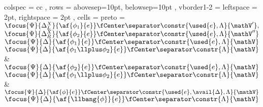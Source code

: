\begin{tblr}{ colspec = { cc } 
	    , rows = {abovesep=10pt, belowsep=10pt}
	    , vborder{1-2} = { leftspace = 2pt, rightspace = 2pt } 
	    , cells = { preto = {\footnotesize} }
	    }
	\AX$\focus{\Psi}{\Delta_L^X}{\af{\phi_1}{e}} \fCenter \separator \constr{\used{e}, \Lambda}{\mathV'},$
	\noLine
	\UI$\focus{\Psi}{\Delta_R^X}{\af{\phi_2}{e}} \fCenter \separator \constr{\used{e}, \Lambda}{\mathV''}$
	\LeftLabel{\derRule{\displayten}}
	\DP
	\\ 
	\AX$\focus{\Psi}{\Delta}{\af{\phi_1}{e}} \fCenter \separator \constr{\used{e}, \Lambda}{\mathV}$
	\LeftLabel{\derRule{\displayplus[L]}}
	\UI$\focus{\Psi}{\Delta}{\af{\phi_1 \llplus \phi_2}{e}} \fCenter \separator \constr{\Lambda}{\mathV}$
	\DP
	&
	\AX$\focus{\Psi}{\Delta}{\af{\phi_2}{e}} \fCenter \separator \constr{\used{e}, \Lambda}{\mathV}$
	\LeftLabel{\derRule{\displayplus[R]}}
	\UI$\focus{\Psi}{\Delta}{\af{\phi_1 \llplus \phi_2}{e}} \fCenter \separator \constr{\Lambda}{\mathV}$
	\DP
	\\
	\LeftLabel{\derRule{\displayone}}
	\DP
	&
	\AX$\focus{\Psi}{\Delta}{\af{\phi}{e}} \fCenter \separator \constr{\used{e}, \avail{\Delta}, \Lambda }{\mathV}$
	\LeftLabel{\derRule{\displaybang}}
	\UI$\focus{\Psi}{\Delta}{\af{\llbang{\phi}}{e}} \fCenter \separator \constr{\Lambda}{\mathV}$
	\DP
	\\
	\LeftLabel{\derRule{\displaytoasy}}
	\DP
\end{tblr}

